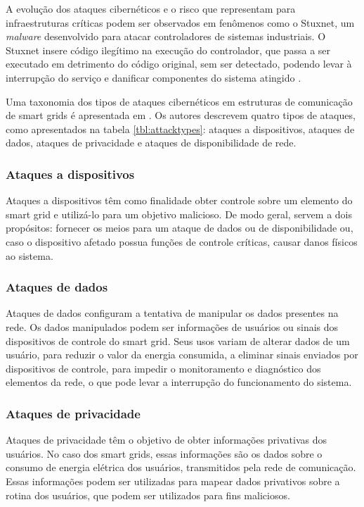 \documentclass[cic,tc]{iiufrgs}
\begin{document}
A evolução dos ataques cibernéticos e o risco que representam para infraestruturas críticas podem ser observados em fenômenos como o Stuxnet, um \textit{malware} desenvolvido para atacar controladores de sistemas industriais. O Stuxnet insere código ilegítimo na execução do controlador, que passa a ser executado em detrimento do código original, sem ser detectado, podendo levar à interrupção do serviço e danificar componentes do sistema atingido \cite{langner2011stuxnet}.

Uma taxonomia dos tipos de ataques cibernéticos em estruturas de comunicação de smart grids é apresentada em \cite{li2012securing}. Os autores descrevem quatro tipos de ataques, como apresentados na tabela \ref{tbl:attacktypes}: ataques a dispositivos, ataques de dados, ataques de privacidade e ataques de disponibilidade de rede.

\subsubsection{Ataques a dispositivos}
Ataques a dispositivos têm como finalidade obter controle sobre um elemento do smart grid e utilizá-lo para um objetivo malicioso. De modo geral, servem a dois propósitos: fornecer os meios para um ataque de dados ou de disponibilidade ou, caso o dispositivo afetado possua funções de controle críticas, causar danos físicos ao sistema.

\subsubsection{Ataques de dados}
Ataques de dados configuram a tentativa de manipular os dados presentes na rede. Os dados manipulados podem ser informações de usuários ou sinais dos dispositivos de controle do smart grid. Seus usos variam de alterar dados de um usuário, para reduzir o valor da energia consumida, a eliminar sinais enviados por dispositivos de controle, para impedir o monitoramento e diagnóstico dos elementos da rede, o que pode levar a interrupção do funcionamento do sistema.

\subsubsection{Ataques de privacidade}
Ataques de privacidade têm o objetivo de obter informações privativas dos usuários. No caso dos smart grids, essas informações são os dados sobre o consumo de energia elétrica dos usuários, transmitidos pela rede de comunicação. Essas informações podem ser utilizadas para mapear dados privativos sobre a rotina dos usuários, que podem ser utilizados para fins maliciosos.
\end{document}
